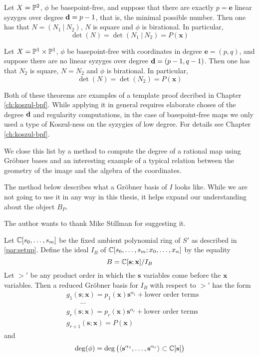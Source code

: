 \documentclass[fleqn,reqno]{amsart}
\numberwithin{first}{chapter}
\begin{document}
\begin{theorem}
\label{thm:rel-moving-planes-quadrics}
Let $X=\mathbb{P}^2$, $\phi$ be basepoint-free,
and suppose that there are exactly $p=\mathbf e$ linear syzyges over degree $\mathbf d=p-1$,
that is, the minimal possible number.
Then one has that $N=(N_1~|~N_2)$, $N$ is square and $\phi$ is birational.
In particular,
\[
\det(N)=\det(N_1~|~N_2)=P(\mathbf x)
\]
\end{theorem}

\begin{theorem}
\label{thm:rel-moving-quadrics}
Let $X=\mathbb{P}^1\times\mathbb{P}^1$, $\phi$ be basepoint-free with coordinates in degree $\mathbf e=(p,q)$,
and suppose there are no linear syzyges over degree $\mathbf d=(p-1,q-1)$.
Then one has that $N_2$ is square, $N=N_2$ and $\phi$ is birational. In particular,
\[
	\det(N)=\det(N_2)=P(\mathbf x)
\]
\end{theorem}

\begin{paragraf*}
Both of these theorems are examples of a template proof decribed in Chapter \ref{ch:koszul-bpf}.
While applying it in general requires elaborate choses of the degree $\mathbf d$ and
regularity computations, in the case of basepoint-free maps we only used a type
of Koszul-ness on the syzygies of low degree. For details see Chapter \ref{ch:koszul-bpf}.
\end{paragraf*}



\begin{paragraf*}
We close this list by a method to compute the degree of a rational map using Gr\"{o}bner bases
and an interesting example of a typical relation between the geometry of the image and the
algebra of the coordinates.

The method below describes what a Gr\"{o}bner basis of $I$ looks like. While we are not
going to use it in any way in this thesis, it helps expand our understanding about the object $B_P$.

The author wants to thank Mike Stillman for suggesting it.
\end{paragraf*}

\begin{proposition}
\label{prop:degviaGB}
Let $\mathbb{C}[s_0,\ldots,s_m]$ be the fixed ambient polynomial ring of $S'$ as described in \ref{par:setup}.
Define the ideal $I_B$ of $\mathbb{C}[s_0,\ldots,s_m;x_0,\ldots,x_n]$ by the equality
\[
	B=\mathbb{C}[\mathbf s;\mathbf x]/I_B
\]
Let $>'$ be any product order in which the $\mathbf s$ variables
come before the $\mathbf x$ variables.
Then a reduced Gr\"obner basis for $I_B$ with respect to $>'$ has the form
\begin{align*}
	&g_1(\mathbf s;\mathbf x)=p_1(\mathbf x){\mathbf s}^{\alpha_1}+\text{lower order terms}\\
	&\qquad\cdots\\
	&g_r(\mathbf s;\mathbf x)=p_r(\mathbf x){\mathbf s}^{\alpha_r}+\text{lower order terms}\\
	&g_{r+1}(\mathbf s;\mathbf x)=P(\mathbf x)
\end{align*}
and
\[
	\deg(\phi)=\deg \big(\langle{\mathbf s}^{\alpha_1},\ldots,{\mathbf s}^{\alpha_r}\rangle\subset\mathbb{C}[\mathbf s]\big)
\]
\end{proposition}
\end{document}
